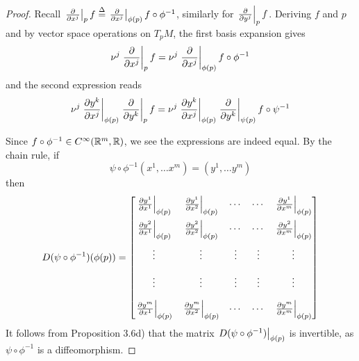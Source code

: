 \documentclass[../main-manifolds.tex]{subfiles}
\begin{document}
\begin{proof}
    Recall $\eval{\pdv{x^j}}_{p}f \defined \eval{\pdv{x^j}}_{\phi(p)} f\circ\phi^{-1}$, similarly for $\eval{\pdv{y^j}}_{p}f$. Deriving $f$ and $p$ and by vector space operations on $T_pM$, the first basis expansion gives
    \begin{equation}\label{lee-chap-1-basis-expansion-1}
        \nu^j\eval{\pdv{x^j}}_{p}f = \nu^j\eval{\pdv{x^j}}_{\phi(p)}f\circ\phi^{-1}
    \end{equation}
    and the second expression reads
    \begin{equation}\label{lee-chap-1-basis-expansion-2}
        \nu^j\eval{\pdv{y^k}{x^j}}_{\phi(p)}\eval{\pdv{y^k}}_p f = \nu^j\eval{\pdv{y^k}{x^j}}_{\phi(p)}\eval{\pdv{y^k}}_{\psi(p)}f\circ\psi^{-1}
    \end{equation}
    
    Since $f\circ\phi^{-1}\in \cinf[\realm,\real]$, we see the expressions are indeed equal. By the chain rule, if
    \[
        \psi\circ\phi^{-1}(x^1,\ldots x^m) = (y^1,\ldots y^m)
    \]
    then
    \[
        D(\psi\circ\phi^{-1})(\phi(p)) = \begin{bmatrix}\eval{\pdv{y^1}{x^1}}_{\phi(p)} & \eval{\pdv{y^1}{x^2}}_{\phi(p)} & \cdots & \cdots & \eval{\pdv{y^1}{x^m}}_{\phi(p)} \\[1em] \eval{\pdv{y^2}{x^1}}_{\phi(p)} & \eval{\pdv{y^2}{x^2}}_{\phi(p)} & \cdots & \cdots & \eval{\pdv{y^2}{x^m}}_{\phi(p)} \\[1em] \vdots & \vdots & \vdots & \vdots & \vdots \\[1em] \vdots & \vdots & \vdots & \vdots & \vdots \\[1em] \eval{\pdv{y^m}{x^1}}_{\phi(p)} & \eval{\pdv{y^m}{x^2}}_{\phi(p)} & \cdots & \cdots & \eval{\pdv{y^m}{x^m}}_{\phi(p)}\end{bmatrix}
    \]
    It follows from Proposition 3.6d) that the matrix $\eval{D(\psi\circ\phi^{-1})}_{\phi(p)}$ is invertible, as $\psi\circ\phi^{-1}$ is a diffeomorphism.
\end{proof}
\end{document}
